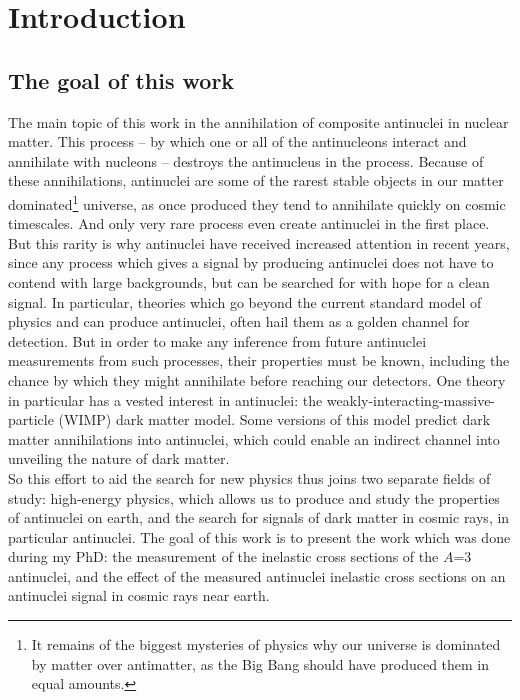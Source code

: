 \section{Introduction}

\subsection{The goal of this work}
The main topic of this work in the annihilation of composite antinuclei in nuclear matter. This process -- by which one or all of the antinucleons interact and annihilate with nucleons -- destroys the antinucleus in the process. Because of these annihilations, antinuclei are some of the rarest stable objects in our matter dominated\footnote{It remains of the biggest mysteries of physics why our universe is dominated by matter over antimatter, as the Big Bang should have produced them in equal amounts.} universe, as once produced they tend to annihilate quickly on cosmic timescales. And only very rare process even create antinuclei in the first place. \\
But this rarity is why antinuclei have received increased attention in recent years\cite{}, since any process which gives a signal by producing antinuclei does not have to contend with large backgrounds, but can be searched for with hope for a clean signal. In particular, theories which go beyond the current standard model of physics and can produce antinuclei, often hail them as a golden channel for detection. But in order to make any inference from future antinuclei measurements from such processes, their properties must be known, including the chance by which they might annihilate before reaching our detectors. One theory in particular has a vested interest in antinuclei: the weakly-interacting-massive-particle (WIMP) dark matter model. Some versions of this model predict dark matter annihilations into antinuclei, which could enable an indirect channel into unveiling the nature of dark matter.\\

So this effort to aid the search for new physics thus joins two separate fields of study: high-energy physics, which allows us to produce and study the properties of antinuclei on earth, and the search for signals of dark matter in cosmic rays, in particular antinuclei. The goal of this work is to present the work which was done during my PhD: the measurement of the inelastic cross sections of the $A$=3 antinuclei, and the effect of the measured antinuclei inelastic cross sections on an antinuclei signal in cosmic rays near earth. 

